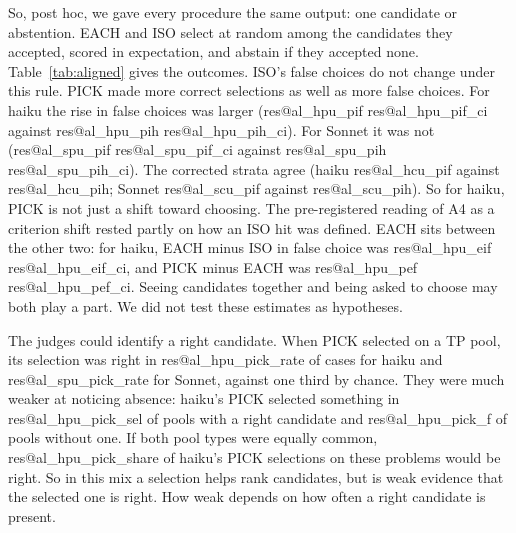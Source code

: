 \documentclass[10pt,twocolumn]{article}
\makeatletter
\newcommand{\res}[1]{\csname res@#1\endcsname}
\makeatother
\begin{document}
So, post hoc, we gave every procedure the same output: one candidate or abstention. EACH and ISO select at random among the candidates they accepted, scored in expectation, and abstain if they accepted none. Table~\ref{tab:aligned} gives the outcomes. ISO's false choices do not change under this rule. PICK made more correct selections as well as more false choices. For haiku the rise in false choices was larger (\res{al_hpu_pif} \res{al_hpu_pif_ci} against \res{al_hpu_pih} \res{al_hpu_pih_ci}). For Sonnet it was not (\res{al_spu_pif} \res{al_spu_pif_ci} against \res{al_spu_pih} \res{al_spu_pih_ci}). The corrected strata agree (haiku \res{al_hcu_pif} against \res{al_hcu_pih}; Sonnet \res{al_scu_pif} against \res{al_scu_pih}). So for haiku, PICK is not just a shift toward choosing. The pre-registered reading of A4 as a criterion shift rested partly on how an ISO hit was defined. EACH sits between the other two: for haiku, EACH minus ISO in false choice was \res{al_hpu_eif} \res{al_hpu_eif_ci}, and PICK minus EACH was \res{al_hpu_pef} \res{al_hpu_pef_ci}. Seeing candidates together and being asked to choose may both play a part. We did not test these estimates as hypotheses.

The judges could identify a right candidate. When PICK selected on a TP pool, its selection was right in \res{al_hpu_pick_rate} of cases for haiku and \res{al_spu_pick_rate} for Sonnet, against one third by chance. They were much weaker at noticing absence: haiku's PICK selected something in \res{al_hpu_pick_sel} of pools with a right candidate and \res{al_hpu_pick_f} of pools without one. If both pool types were equally common, \res{al_hpu_pick_share} of haiku's PICK selections on these problems would be right. So in this mix a selection helps rank candidates, but is weak evidence that the selected one is right. How weak depends on how often a right candidate is present.
\end{document}
